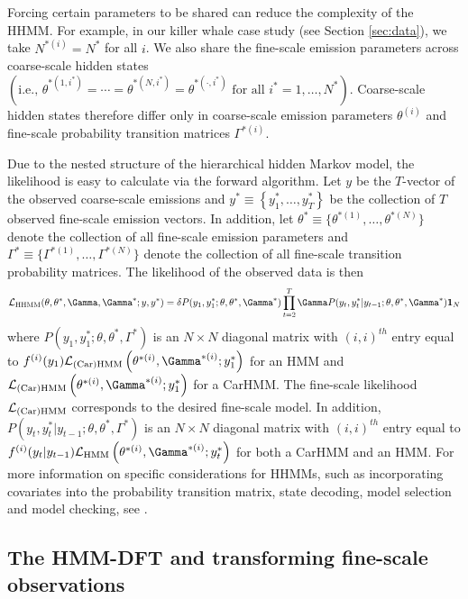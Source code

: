 Forcing certain parameters to be shared can reduce the complexity of the HHMM. For example, in our killer whale case study (see Section \ref{sec:data}), we take $N^{*(i)} = N^*$ for all $i$. We also share the fine-scale emission parameters across coarse-scale hidden states $\left( \text{i.e., } \theta^{*(1,i^*)} = \cdots = \theta^{*(N,i^*)} = \theta^{*(\cdot,i^*)} \text{ for all } i^* = 1, \ldots, N^* \right)$. Coarse-scale hidden states therefore differ only in coarse-scale emission parameters $\theta^{(i)}$ and fine-scale probability transition matrices $\Gamma^{*(i)}$.

Due to the nested structure of the hierarchical hidden Markov model, the likelihood is easy to calculate via the forward algorithm.
%
Let $y$ be the $T$-vector of the observed coarse-scale emissions and
$y^* \equiv \left\{y^*_1, \ldots,y^*_T\right\}$ be the collection of $T$ observed fine-scale emission vectors.
%
In addition, let $\theta^* \equiv \{\theta^{*(1)}, \ldots, \theta^{*(N)}\}$ denote the collection of all fine-scale emission parameters and $\Gamma^* \equiv \{\Gamma^{*(1)}, \ldots, \Gamma^{*(N)}\}$ denote the collection of all fine-scale transition probability matrices. The likelihood of the observed data is then
%
\begin{equation}
    \calL_{\text{HHMM}}(\theta,\theta^*,\Gamma,\Gamma^*;y,y^*) = \delta P(y_1,y_1^*;\theta,\theta^*,\Gamma^*) \prod_{t=2}^T \Gamma P(y_t,y_t^*|y_{t-1};\theta,\theta^*,\Gamma^*) \mathbf{1}_N
    \label{eqn:HHMM_likelihood}
\end{equation}
%
where $P(y_1,y_1^*;\theta,\theta^*,\Gamma^*)$ is an $N \times N$ diagonal matrix with $(i,i)^{th}$ entry equal to $f^{(i)}(y_1)\calL_{\text{(Car)HMM}}\left(\theta^{*(i)},
\Gamma^{*(i)};y_1^*\right)$ for an HMM and $\calL_{\text{(Car)HMM}}\left(\theta^{*(i)},
\Gamma^{*(i)};y_1^*\right)$ for a CarHMM. The fine-scale likelihood $\mathcal{L}_{\text{(Car)HMM}}$ corresponds to the desired fine-scale model. In addition, $P(y_t,y_t^*|y_{t-1};\theta,\theta^*,\Gamma^*)$ is an $N \times N$ diagonal matrix with $(i,i)^{th}$ entry equal to 
$f^{(i)}(y_t|y_{t-1})\calL_{\text{HMM}}\left(\theta^{*(i)},
\Gamma^{*(i)};y_t^*\right)$ for both a CarHMM and an HMM.
%
For more information on specific considerations for HHMMs, such as incorporating covariates into the probability transition matrix, state decoding, model selection and model checking, see \citet{Adam:2019}. 

\subsection{The HMM-DFT and transforming fine-scale observations}
\label{subsec:STFT}

